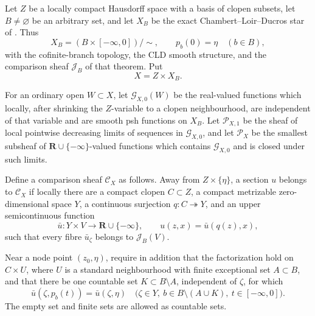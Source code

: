 
\begin{theorem}
\label{thm:p071-stone-infinite-star-collapse}
Let \(Z\) be a locally compact Hausdorff space with a basis of clopen
subsets, let \(B\ne\varnothing\) be an arbitrary set, and let \(X_B\) be
the exact Chambert--Loir--Ducros star of
.  Thus
\[
 X_B=(B\times[-\infty,0])/{\sim},
 \qquad p_b(0)=\eta\quad(b\in B),
\]
with the cofinite-branch topology, the CLD smooth structure, and the
comparison sheaf \(\mathscr J_B\) of that theorem.  Put
\[
                              X=Z\times X_B .
\]

For an ordinary open \(W\subset X\), let \(\mathcal G_{X,0}(W)\) be the
real-valued functions which locally, after shrinking the \(Z\)-variable
to a clopen neighbourhood, are independent of that variable and are
smooth psh functions on \(X_B\).  Let \(\mathcal P_{X,1}\) be the sheaf
of local pointwise decreasing limits of sequences in
\(\mathcal G_{X,0}\), and let \(\mathcal P_X\) be the smallest subsheaf
of \(\mathbf R\cup\{-\infty\}\)-valued functions which contains
\(\mathcal G_{X,0}\) and is closed under such limits.

Define a comparison sheaf \(\mathcal C_X\) as follows.  Away from
\(Z\times\{\eta\}\), a section \(u\) belongs to \(\mathcal C_X\) if
locally there are a compact clopen \(C\subset Z\), a compact metrizable
zero-dimensional space \(Y\), a continuous surjection
\(q:C\twoheadrightarrow Y\), and an upper semicontinuous function
\begin{equation}
 \bar u:Y\times V\longrightarrow\mathbf R\cup\{-\infty\},
 \qquad
 u(z,x)=\bar u(q(z),x),
 \label{eq:p071-stone-infinite-factor-away}
\end{equation}
such that every fibre \(\bar u_\zeta\) belongs to
\(\mathscr J_B(V)\).

Near a node point \((z_0,\eta)\), require in addition that the
factorization hold on \(C\times U\), where \(U\) is a standard
neighbourhood with finite exceptional set \(A\subset B\), and that there
be one countable set \(K\subset B\setminus A\), independent of
\(\zeta\), for which
\begin{equation}
 \bar u(\zeta,p_b(t))=\bar u(\zeta,\eta)
 \quad
 \bigl(\zeta\in Y,\ b\in B\setminus(A\cup K),\
       t\in[-\infty,0]\bigr).
 \label{eq:p071-stone-infinite-common-activity}
\end{equation}
The empty set and finite sets are allowed as countable sets.


\end{theorem}
